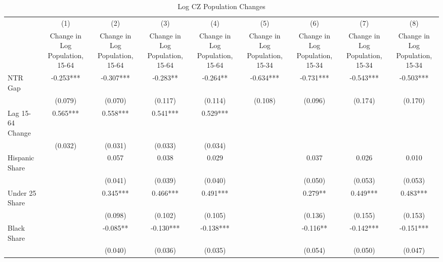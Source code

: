 \begin{table}[htbp]\centering
\def\sym#1{\ifmmode^{#1}\else\(^{#1}\)\fi}
\caption{Log CZ Population Changes}
\begin{tabular}{l*{8}{c}}
\toprule
                    &\multicolumn{1}{c}{(1)}&\multicolumn{1}{c}{(2)}&\multicolumn{1}{c}{(3)}&\multicolumn{1}{c}{(4)}&\multicolumn{1}{c}{(5)}&\multicolumn{1}{c}{(6)}&\multicolumn{1}{c}{(7)}&\multicolumn{1}{c}{(8)}\\
                    &\multicolumn{1}{c}{Change in Log Population, 15-64}&\multicolumn{1}{c}{Change in Log Population, 15-64}&\multicolumn{1}{c}{Change in Log Population, 15-64}&\multicolumn{1}{c}{Change in Log Population, 15-64}&\multicolumn{1}{c}{Change in Log Population, 15-34}&\multicolumn{1}{c}{Change in Log Population, 15-34}&\multicolumn{1}{c}{Change in Log Population, 15-34}&\multicolumn{1}{c}{Change in Log Population, 15-34}\\
\midrule
NTR Gap             &   -0.253***&   -0.307***&   -0.283** &   -0.264** &   -0.634***&   -0.731***&   -0.543***&   -0.503***\\
                    &  (0.079)   &  (0.070)   &  (0.117)   &  (0.114)   &  (0.108)   &  (0.096)   &  (0.174)   &  (0.170)   \\
\addlinespace
Lag 15-64 Change    &    0.565***&    0.558***&    0.541***&    0.529***&            &            &            &            \\
                    &  (0.032)   &  (0.031)   &  (0.033)   &  (0.034)   &            &            &            &            \\
\addlinespace
Hispanic Share      &            &    0.057   &    0.038   &    0.029   &            &    0.037   &    0.026   &    0.010   \\
                    &            &  (0.041)   &  (0.039)   &  (0.040)   &            &  (0.050)   &  (0.053)   &  (0.053)   \\
\addlinespace
Under 25 Share      &            &    0.345***&    0.466***&    0.491***&            &    0.279** &    0.449***&    0.483***\\
                    &            &  (0.098)   &  (0.102)   &  (0.105)   &            &  (0.136)   &  (0.155)   &  (0.153)   \\
\addlinespace
Black Share         &            &   -0.085** &   -0.130***&   -0.138***&            &   -0.116** &   -0.142***&   -0.151***\\
                    &            &  (0.040)   &  (0.036)   &  (0.035)   &            &  (0.054)   &  (0.050)   &  (0.047)   \\

\end{tabular}
\end{table}
